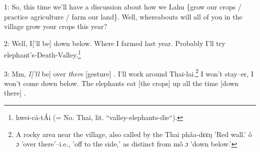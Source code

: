 
1: So, this time we'll have a discussion about how we Lahu \{grow our crops / practice
agriculture / farm our land\}. Well, whereabouts will all of you in the village
grow your crops this year?

2: Well, I['ll be]  down below. Where I farmed last year. Probably I'll try elephant's-Death-Valley.\footnote{hwei-cà-tÁi (= No. Thai, lit. ``valley-elephants-die``).}

3: Mm, \textit{I['ll} be]  over \textit{there} [gesture] . I'll work around Thai-lai.\footnote{A rocky area near the village, also called by the Thai phǎa-dɛɛŋ 'Red wall.' ô \emph{ɔ} 'over there'--i.e., 'off to the side,' as distinct from mô \emph{ɔ} 'down below.'}
I won't stay--er, I won't come down below. The elephants eat [the crops]  up all
the time [down there] .

